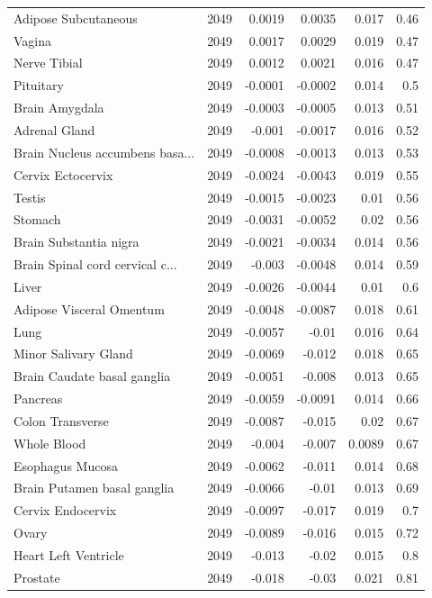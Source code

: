 \documentclass{article}
\begin{document}
\begin{table}[h!]
\begin{tabular}{lrrrrr}
  Adipose Subcutaneous & 2049 & 0.0019 & 0.0035 & 0.017 & 0.46 \\ 
  Vagina  & 2049 & 0.0017 & 0.0029 & 0.019 & 0.47 \\ 
  Nerve Tibial  & 2049 & 0.0012 & 0.0021 & 0.016 & 0.47 \\ 
  Pituitary  & 2049 & -0.0001 & -0.0002 & 0.014 & 0.5 \\ 
  Brain Amygdala & 2049 & -0.0003 & -0.0005 & 0.013 & 0.51 \\ 
  Adrenal Gland & 2049 & -0.001 & -0.0017 & 0.016 & 0.52 \\ 
  Brain Nucleus accumbens basa... & 2049 & -0.0008 & -0.0013 & 0.013 & 0.53 \\ 
  Cervix Ectocervix & 2049 & -0.0024 & -0.0043 & 0.019 & 0.55 \\ 
  Testis  & 2049 & -0.0015 & -0.0023 & 0.01 & 0.56 \\ 
  Stomach  & 2049 & -0.0031 & -0.0052 & 0.02 & 0.56 \\ 
  Brain Substantia nigra & 2049 & -0.0021 & -0.0034 & 0.014 & 0.56 \\ 
  Brain Spinal cord cervical c... & 2049 & -0.003 & -0.0048 & 0.014 & 0.59 \\ 
  Liver & 2049 & -0.0026 & -0.0044 & 0.01 & 0.6 \\ 
  Adipose Visceral Omentum & 2049 & -0.0048 & -0.0087 & 0.018 & 0.61 \\ 
  Lung & 2049 & -0.0057 & -0.01 & 0.016 & 0.64 \\ 
  Minor Salivary Gland & 2049 & -0.0069 & -0.012 & 0.018 & 0.65 \\ 
  Brain Caudate basal ganglia & 2049 & -0.0051 & -0.008 & 0.013 & 0.65 \\ 
  Pancreas & 2049 & -0.0059 & -0.0091 & 0.014 & 0.66 \\ 
  Colon Transverse & 2049 & -0.0087 & -0.015 & 0.02 & 0.67 \\ 
  Whole Blood & 2049 & -0.004 & -0.007 & 0.0089 & 0.67 \\ 
  Esophagus Mucosa & 2049 & -0.0062 & -0.011 & 0.014 & 0.68 \\ 
  Brain Putamen basal ganglia & 2049 & -0.0066 & -0.01 & 0.013 & 0.69 \\ 
  Cervix Endocervix & 2049 & -0.0097 & -0.017 & 0.019 & 0.7 \\ 
  Ovary & 2049 & -0.0089 & -0.016 & 0.015 & 0.72 \\ 
  Heart Left Ventricle & 2049 & -0.013 & -0.02 & 0.015 & 0.8 \\ 
  Prostate & 2049 & -0.018 & -0.03 & 0.021 & 0.81 \\ 

\end{tabular}
\end{table}
\end{document}
